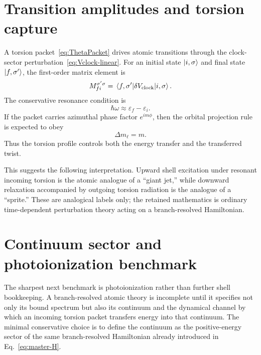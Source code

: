 \documentclass[11pt,a4paper]{article}
\begin{document}
\section{Transition amplitudes and torsion capture}
A torsion packet~\eqref{eq:ThetaPacket} drives atomic transitions through the clock-sector perturbation~\eqref{eq:Vclock-linear}. For an initial state $\ket{i,\sigma}$ and final state $\ket{f,\sigma'}$, the first-order matrix element is
\begin{equation}
\label{eq:Mfi}
M_{fi}^{\sigma'\sigma}=\matrixel{f,\sigma'}{\delta V_{\rm clock}}{i,\sigma}.
\end{equation}
The conservative resonance condition is
\begin{equation}
\label{eq:resonance}
\hbar\omega \approx \varepsilon_f-\varepsilon_i.
\end{equation}
If the packet carries azimuthal phase factor $e^{im\phi}$, then the orbital projection rule is expected to obey
\begin{equation}
\label{eq:dm}
\Delta m_\ell = m.
\end{equation}
Thus the torsion profile controls both the energy transfer and the transferred twist.

This suggests the following interpretation. Upward shell excitation under resonant incoming torsion is the atomic analogue of a ``giant jet,'' while downward relaxation accompanied by outgoing torsion radiation is the analogue of a ``sprite.'' These are analogical labels only; the retained mathematics is ordinary time-dependent perturbation theory acting on a branch-resolved Hamiltonian.

\section{Continuum sector and photoionization benchmark}
The sharpest next benchmark is photoionization rather than further shell bookkeeping. A branch-resolved atomic theory is incomplete until it specifies not only its bound spectrum but also its continuum and the dynamical channel by which an incoming torsion packet transfers energy into that continuum. The minimal conservative choice is to define the continuum as the positive-energy sector of the same branch-resolved Hamiltonian already introduced in Eq.~\eqref{eq:master-H}.
\end{document}
